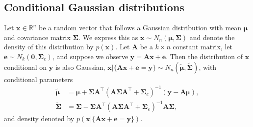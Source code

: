 \documentclass[12pt]{article}
\begin{document}
\subsection{Conditional Gaussian distributions}

Let $\bm{x} \in \mathbb{R}^n$ be a random vector that follows a Gaussian distribution with mean $\bm{\mu}$ and covariance matrix $\bm{\Sigma}$. We express this as $\bm{x} \sim N_n(\bm{\mu}, \bm{\Sigma})$ and denote the density of this distribution by $p(\bm{x})$. 
Let $\bm{A}$ be a $k \times n$ constant matrix, let $\bm{e}\sim N_k(\bm{0}, \bm{\Sigma}_e)$, and suppose we observe $\bm{y}=\bm{A}\bm{x}+\bm{e}$.
Then the distribution of $\bm{x}$ conditional on $\bm{y}$ is also Gaussian, $\bm{x}|\{\bm{A}\bm{x}+\bm{e}=\bm{y}\} \sim N_n(\tilde{\bm{\mu}}, \tilde{\bm{\Sigma}})$, with conditional parameters
\begin{equation} \label{eq:gaussian_conditional_pars}
\begin{split}
    \tilde{\bm{\mu}}&= \bm{\mu} + \bm{\Sigma} \bm{A}^{\top} (\bm{A} \bm{\Sigma} \bm{A}^{\top} + \bm{\Sigma}_e)^{-1} (\bm{y} - \bm{A} \bm{\mu}),\\
    \tilde{\bm{\Sigma}} &= \bm{\Sigma} - \bm{\Sigma} \bm{A}^{\top} (\bm{A}\bm{\Sigma} \bm{A}^{\top} + \bm{\Sigma}_e)^{-1}\bm{A}\bm{\Sigma},
\end{split}
\end{equation}
and density denoted by $p(\bm{x} | \{\bm{A}\bm{x}+\bm{e}=\bm{y}\} )$.

\end{document}
